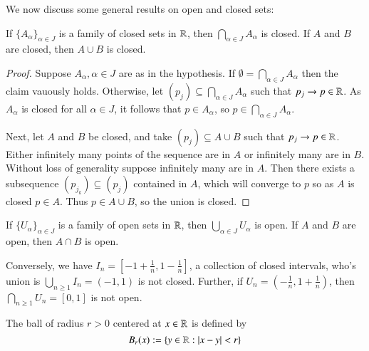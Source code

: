 We now discuss some general results on open and closed sets: 

\begin{proposition}
    If $\{A_{\alpha}\}_{\alpha \in J}$ is a family of closed sets in $\mathbb R$, then $\bigcap_{\alpha\in J}A_{\alpha}$ is closed. If $A$ and $B$ are closed, then $A \cup B$ is closed.
\end{proposition}
\begin{proof}
    Suppose $A_{\alpha},\alpha \in J$ are as in the hypothesis. If $\emptyset = \bigcap_{\alpha \in J}A_{\alpha}$ then the claim vauously holds. Otherwise, let $(p_j) \subseteq \bigcap_{\alpha \in J}A_{\alpha}$ such that $p_j \rightarrow p \in \mathbb R$. As $A_{\alpha}$ is closed for all $\alpha \in J$, it follows that $p \in A_{\alpha}$, so $p \in \bigcap_{\alpha \in J}A_{\alpha}$. 

    Next, let $A$ and $B$ be closed, and take $(p_j) \subseteq A\cup B$ such that $p_j\rightarrow p \in \mathbb R$. Either infinitely many points of the sequence are in $A$ or infinitely many are in $B$. Without loss of generality suppose infinitely many are in $A$. Then there exists a subsequence $(p_{j_k}) \subseteq (p_j)$ contained in $A$, which will converge to $p$ so as $A$ is closed $p \in A$. Thus $p \in A \cup B$, so the union is closed.
\end{proof}

\begin{corollary}
    If $\{U_{\alpha}\}_{\alpha \in J}$ is a family of open sets in $\mathbb R$, then $\bigcup_{\alpha\in J}U_{\alpha}$ is open. If $A$ and $B$ are open, then $A \cap B$ is open.
\end{corollary}

Conversely, we have $I_n = [-1+\frac{1}{n},1-\frac{1}{n}]$, a collection of closed intervals, who's union is $\bigcup_{n\geq 1}I_n = (-1,1)$ is not closed. Further, if $U_n = (-\frac{1}{n},1+\frac{1}{n})$, then $\bigcap_{n\geq 1}U_n = [0,1]$ is not open.

\begin{definition}
    The ball of radius $r > 0$ centered at $x \in \mathbb R$ is defined by $$B_r(x) := \{y \in \mathbb R:|x-y| < r\}$$ 
\end{definition}

